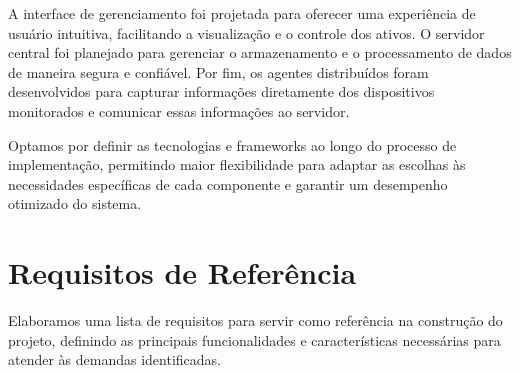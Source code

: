 A interface de gerenciamento foi projetada para oferecer uma experiência de usuário intuitiva, facilitando a visualização e o controle dos ativos. O servidor central foi planejado para gerenciar o armazenamento e o processamento de dados de maneira segura e confiável. Por fim, os agentes distribuídos foram desenvolvidos para capturar informações diretamente dos dispositivos monitorados e comunicar essas informações ao servidor.  

Optamos por definir as tecnologias e frameworks ao longo do processo de implementação, permitindo maior flexibilidade para adaptar as escolhas às necessidades específicas de cada componente e garantir um desempenho otimizado do sistema.


\section{Requisitos de Referência}
Elaboramos uma lista de requisitos para servir como referência na construção do projeto, definindo as principais funcionalidades e características necessárias para atender às demandas identificadas.
